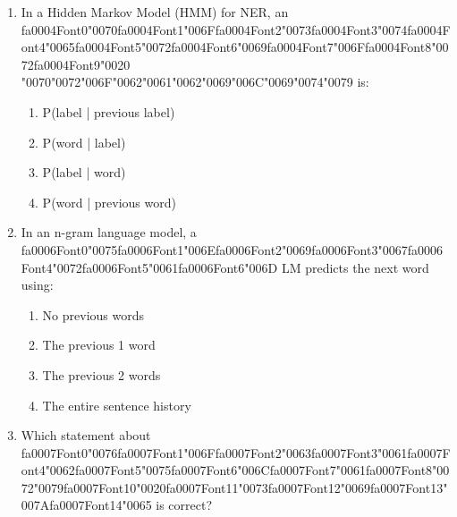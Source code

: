 \documentclass[12pt]{article}
\begin{document}
\begin{enumerate}[label=Q\arabic*.]
\item In a Hidden Markov Model (HMM) for NER, an {\csname fa0004Font0\endcsname\char"0070}{\csname fa0004Font1\endcsname\char"006F}{\csname fa0004Font2\endcsname\char"0073}{\csname fa0004Font3\endcsname\char"0074}{\csname fa0004Font4\endcsname\char"0065}{\csname fa0004Font5\endcsname\char"0072}{\csname fa0004Font6\endcsname\char"0069}{\csname fa0004Font7\endcsname\char"006F}{\csname fa0004Font8\endcsname\char"0072}{\csname fa0004Font9\endcsname\char"0020} {\char"0070}{\char"0072}{\char"006F}{\char"0062}{\char"0061}{\char"0062}{\char"0069}{\char"006C}{\char"0069}{\char"0074}{\char"0079} is:
\begin{enumerate}[label=(\Alph*)]
    \item P(label | previous label)
    \item P(word | label)
    \item P(label | word)
    \item P(word | previous word)
\end{enumerate}
\item In an n-gram language model, a {\csname fa0006Font0\endcsname\char"0075}{\csname fa0006Font1\endcsname\char"006E}{\csname fa0006Font2\endcsname\char"0069}{\csname fa0006Font3\endcsname\char"0067}{\csname fa0006Font4\endcsname\char"0072}{\csname fa0006Font5\endcsname\char"0061}{\csname fa0006Font6\endcsname\char"006D} LM predicts the next word using:
\begin{enumerate}[label=(\Alph*)]
    \item No previous words
    \item The previous 1 word
    \item The previous 2 words
    \item The entire sentence history
\end{enumerate}
\item Which statement about {\csname fa0007Font0\endcsname\char"0076}{\csname fa0007Font1\endcsname\char"006F}{\csname fa0007Font2\endcsname\char"0063}{\csname fa0007Font3\endcsname\char"0061}{\csname fa0007Font4\endcsname\char"0062}{\csname fa0007Font5\endcsname\char"0075}{\csname fa0007Font6\endcsname\char"006C}{\csname fa0007Font7\endcsname\char"0061}{\csname fa0007Font8\endcsname\char"0072}{\char"0079}{\csname fa0007Font10\endcsname\char"0020}{\csname fa0007Font11\endcsname\char"0073}{\csname fa0007Font12\endcsname\char"0069}{\csname fa0007Font13\endcsname\char"007A}{\csname fa0007Font14\endcsname\char"0065} is correct?
\begin{enumerate}[label=(\Alph*)]

\end{enumerate}
\end{enumerate}
\end{document}

